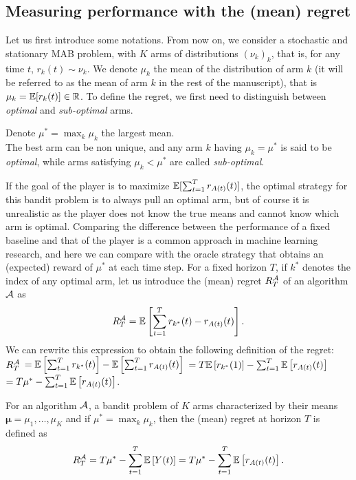 \subsection{Measuring performance with the (mean) regret}

Let us first introduce some notations.
From now on, we consider a stochastic and stationary MAB problem, with $K$ arms of distributions $(\nu_k)_k$, that is, for any time $t$, $r_k(t)\sim \nu_k$.
We denote $\mu_k$ the mean of the distribution of arm $k$ (it will be referred to as the mean of arm $k$ in the rest of the manuscript), that is $\mu_k = \mathbb{E}[r_k(t)] \in \mathbb{R}$.
%
%
To define the regret, we first need to distinguish between \emph{optimal} and \emph{sub-optimal} arms.

\begin{defn}\label{def:2:optimalSubOptimalArms}
    Denote $\mu^* = \max_k \mu_k$ the largest mean.\\
    The best arm can be non unique, and any arm $k$ having $\mu_k = \mu^*$ is said to be \emph{optimal},
    while arms satisfying $\mu_k < \mu^*$ are called \emph{sub-optimal}.
\end{defn}

If the goal of the player is to maximize $\mathbb{E}[\sum_{t=1}^T r_{A(t)}(t)]$,
the optimal strategy for this bandit problem is to always pull an optimal arm, but of course it is unrealistic as the player does not know the true means and cannot know which arm is optimal.
%
Comparing the difference between the performance of a fixed baseline and that of the player is a common approach in machine learning research,
and here we can compare with the oracle strategy that obtains an (expected) reward of $\mu^*$ at each time step.
%
For a fixed horizon $T$, if $k^*$ denotes the index of any optimal arm,
let us introduce the (mean) regret $R_T^{\mathcal{A}}$ of an algorithm $\mathcal{A}$ as
\[ R_T^{\mathcal{A}} = \mathbb{E}\left[ \sum_{t=1}^T r_{k^*}(t) - r_{A(t)}(t) \right]. \]
%
We can rewrite this expression to obtain the following definition of the regret:
$R_T^{\mathcal{A}}$
$= \mathbb{E}\left[ \sum_{t=1}^T r_{k^*}(t) \right] - \mathbb{E}\left[ \sum_{t=1}^T r_{A(t)}(t) \right]$
$= T \mathbb{E}\left[ r_{k^*}(1) \right] - \sum_{t=1}^T \mathbb{E}\left[ r_{A(t)}(t) \right]$
$= T \mu^* - \sum_{t=1}^T \mathbb{E}\left[ r_{A(t)}(t) \right]$.


\begin{defn}[Regret]\label{def:2:regret}
    For an algorithm $\mathcal{A}$, a bandit problem of $K$ arms characterized by their means $\bm{\mu} = \mu_1,\dots,\mu_K$ and if $\mu^* = \max_k \mu_k$, then the (mean) regret at horizon $T$ is defined as
    \begin{equation}
        R_T^{\mathcal{A}} = T \mu^* - \sum_{t=1}^T \mathbb{E}\left[ Y(t) \right] = T \mu^* - \sum_{t=1}^T \mathbb{E}\left[ r_{A(t)}(t) \right].
    \end{equation}
\end{defn}


